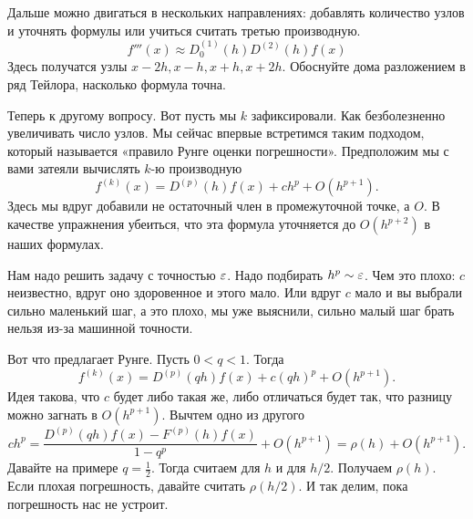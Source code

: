 Дальше можно двигаться в нескольких направлениях: добавлять количество узлов и уточнять формулы или учиться считать третью производную.
\[
  f'''(x)\approx  D_0^{(1)}(h) D^{(2)}(h)f(x)
\]
Здесь получатся узлы $x-2h,x-h,x+h,x+2h$. Обоснуйте дома разложением в ряд Тейлора, насколько формула точна.

Теперь к другому вопросу. Вот пусть мы $k$ зафиксировали. Как безболезненно увеличивать число узлов. Мы сейчас впервые встретимся таким подходом, который называется «правило Рунге оценки погрешности». Предположим мы с вами затеяли вычислять $k$-ю производную
\[
  f^{(k)}(x) = D^{(p)}(h)f(x) + ch^p + O(h^{p+1}).
\]
Здесь мы вдруг добавили не остаточный член в промежуточной точке, а $O$. В качестве упражнения убеиться, что эта формула уточняется до $O(h^{p+2})$ в наших формулах.

Нам надо решить задачу с точностью $\varepsilon$. Надо подбирать $h^p\sim \varepsilon$. Чем это плохо: $c$ неизвестно, вдруг оно здоровенное и этого мало. Или вдруг $c$ мало и вы выбрали сильно маленький шаг, а это плохо, мы уже выяснили, сильно малый шаг брать нельзя из-за машинной точности.

Вот что предлагает Рунге. Пусть $0<q<1$. Тогда
\[
  f^{(k)}(x) = D^{(p)}(qh)f(x) + c (qh)^p + O(h^{p+1}).
\]
Идея такова, что $c$ будет либо такая же, либо отличаться будет так, что разницу можно загнать в $O(h^{p+1})$. Вычтем одно из другого
\[
  ch^p = \frac{ D^{(p)}(qh)f(x) - F^{(p)}(h) f(x)}{1- q^p} + O(h^{p+1}) = \rho(h) + O(h^{p+1}).
\]
Давайте на примере $q = \frac12.$ Тогда считаем для $h$ и для $h/2$. Получаем $\rho(h)$. Если плохая погрешность, давайте считать $\rho(h/2)$. И так делим, пока погрешность нас не устроит.
